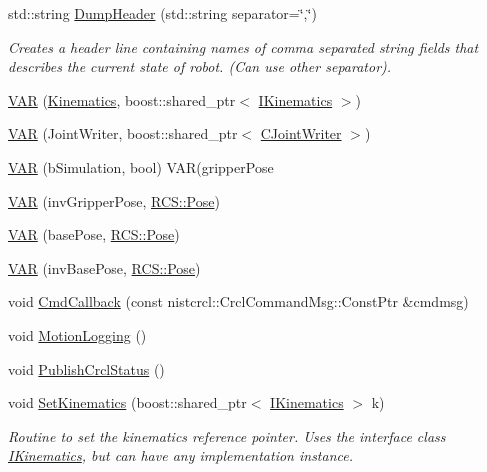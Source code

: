 \begin{DoxyCompactItemize}
std\-::string \hyperlink{structRCS_1_1CController_aaf2b0286ce10f78e5eee44e3613e588e}{Dump\-Header} (std\-::string separator=\char`\"{},\char`\"{})
\begin{DoxyCompactList}\small\item\em Creates a header line containing names of comma separated string fields that describes the current state of robot. (Can use other separator). \end{DoxyCompactList}\item 
\hyperlink{structRCS_1_1CController_abb822466798247a45d3206ecae9c36fc}{V\-A\-R} (\hyperlink{classKinematics}{Kinematics}, boost\-::shared\-\_\-ptr$<$ \hyperlink{classIKinematics}{I\-Kinematics} $>$)
\item 
\hyperlink{structRCS_1_1CController_abe34674042d0b1b983a3e4117310f66c}{V\-A\-R} (Joint\-Writer, boost\-::shared\-\_\-ptr$<$ \hyperlink{classCJointWriter}{C\-Joint\-Writer} $>$)
\item 
\hyperlink{structRCS_1_1CController_a8d733f4562e66f359ca58c2d9d2d73fe}{V\-A\-R} (b\-Simulation, bool) V\-A\-R(gripper\-Pose
\item 
\hyperlink{structRCS_1_1CController_ad9ff9933db2721ba89e532fc57a871f8}{V\-A\-R} (inv\-Gripper\-Pose, \hyperlink{namespaceRCS_aa07e45d8a50e30064283d2b38087f999}{R\-C\-S\-::\-Pose})
\item 
\hyperlink{structRCS_1_1CController_adba057520bba1b50d7fd344f67b1705b}{V\-A\-R} (base\-Pose, \hyperlink{namespaceRCS_aa07e45d8a50e30064283d2b38087f999}{R\-C\-S\-::\-Pose})
\item 
\hyperlink{structRCS_1_1CController_a2d522e82da5f5d2296ea97e4d22b858d}{V\-A\-R} (inv\-Base\-Pose, \hyperlink{namespaceRCS_aa07e45d8a50e30064283d2b38087f999}{R\-C\-S\-::\-Pose})
\item 
void \hyperlink{structRCS_1_1CController_a10aa8d4a96d6dfe4c0da398f2fa5ba0e}{Cmd\-Callback} (const nistcrcl\-::\-Crcl\-Command\-Msg\-::\-Const\-Ptr \&cmdmsg)
\item 
void \hyperlink{structRCS_1_1CController_aaf7dfe624a26a906d715b73a337ea927}{Motion\-Logging} ()
\item 
void \hyperlink{structRCS_1_1CController_a02cf331e363cf90ddd6b4e0e8532b73f}{Publish\-Crcl\-Status} ()
\item 
void \hyperlink{structRCS_1_1CController_a2733d3cf36b11a6b257e04a969e03abf}{Set\-Kinematics} (boost\-::shared\-\_\-ptr$<$ \hyperlink{classIKinematics}{I\-Kinematics} $>$ k)
\begin{DoxyCompactList}\small\item\em Routine to set the kinematics reference pointer. Uses the interface class \hyperlink{classIKinematics}{I\-Kinematics}, but can have any implementation instance. \end{DoxyCompactList}\item 

\end{DoxyCompactItemize}
